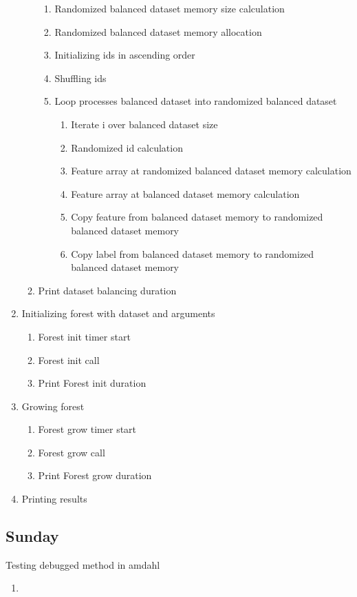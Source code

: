 \documentclass[12pt,oneside]{book}
\begin{document}
\begin{enumerate}
\begin{enumerate}
    \begin{enumerate}
      \item Randomized balanced dataset memory size calculation
      \item Randomized balanced dataset memory allocation
      \item Initializing ids in ascending order
      \item Shuffling ids
      \item Loop processes balanced dataset into randomized balanced dataset
      \begin{enumerate}
        \item Iterate i over balanced dataset size
        \item Randomized id calculation
        \item Feature array at randomized balanced dataset memory calculation
        \item Feature array at balanced dataset memory calculation
        \item Copy feature from balanced dataset memory to randomized balanced dataset memory
        \item Copy label from balanced dataset memory to randomized balanced dataset memory
      \end{enumerate}
    \end{enumerate}
    \item Print dataset balancing duration
  \end{enumerate}  
  \item Initializing forest with dataset and arguments
  \begin{enumerate}
    \item Forest init timer start
    \item Forest init call
    \item Print Forest init duration
  \end{enumerate}
  \item Growing forest
  \begin{enumerate}
    \item Forest grow timer start
    \item Forest grow call
    \item Print Forest grow duration
  \end{enumerate}
  \item Printing results
\end{enumerate}

\subsection*{Sunday}
Testing debugged method in amdahl
\begin{enumerate}
  \item 
\end{enumerate}
\end{document}
